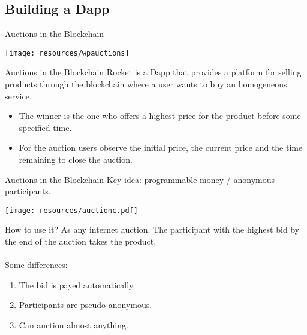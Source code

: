 \begin{darkframes}
\section{Building a Dapp}

\begin{frame}{Auctions in the Blockchain}
	\begin{center}
	\texttt{[image: resources/wpauctions]}
	\end{center}
\end{frame}

\begin{frame}{Auctions in the Blockchain}
Rocket is a Dapp that provides a platform for selling products through the blockchain where a user wants to buy an homogeneous service.
	\begin{itemize}
	\item The winner is the one who offers a highest price for the product before some specified time.
	\item For the auction users observe the initial price, the current price and the time remaining to close the auction. 
	\end{itemize}
\end{frame}

\begin{frame}{Auctions in the Blockchain}
	Key idea: programmable money / anonymous participants. 
	\begin{center}
	\texttt{[image: resources/auctionc.pdf]}
	\end{center}
\end{frame}

\begin{frame}{How to use it?}
	As any internet auction. The participant with the highest bid by the end of the auction takes the product. \\
	~\\
	Some differences:
	\begin{enumerate}
	\item The bid is payed automatically. 
	\item Participants are pseudo-anonymous.
	\item Can auction almost anything.   
	\end{enumerate}
\end{frame}


\end{darkframes}
